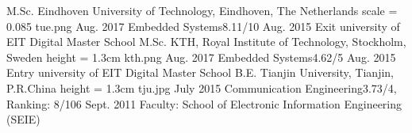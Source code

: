 %
%
%
%
%
% 
\begin{educations}
	\education
    {M.Sc.}			{Eindhoven University of Technology, Eindhoven, The Netherlands}
    {scale = 0.085}			{tue.png}
    {Aug. 2017}		{Embedded Systems}{8.11/10}
    {Aug. 2015}		{Exit university of EIT Digital Master School}
    \universitySeparator
    \education
    {M.Sc.}			{KTH, Royal Institute of Technology, Stockholm, Sweden}
    {height = 1.3cm}			{kth.png}
    {Aug. 2017}		{Embedded Systems}{4.62/5}
    {Aug. 2015}		{Entry university of EIT Digital Master School}
    \universitySeparator
    \education
    {B.E.}			{Tianjin University, Tianjin, P.R.China}
    {height = 1.3cm}			{tju.jpg}
    {July 2015}		{Communication Engineering}{3.73/4, Ranking: 8/106}
    {Sept. 2011}	{Faculty: School of Electronic Information Engineering (SEIE)}

\end{educations}